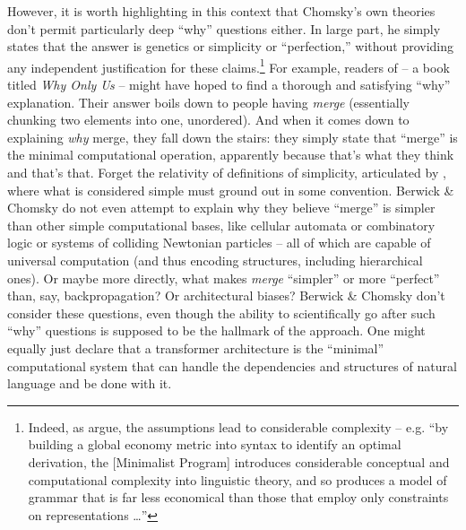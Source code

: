 \documentclass[output=paper,colorlinks,citecolor=brown
]{langscibook}
\begin{document}
However, it is worth highlighting in this context that Chomsky's own theories don't permit particularly deep ``why'' questions either. In large part, he simply states that the answer is genetics or simplicity or ``perfection,'' without providing any independent justification for these claims.\footnote{Indeed, as \citet{johnson1997critique} argue, the assumptions lead to considerable complexity -- e.g. ``by building a global economy  metric into syntax to identify an optimal derivation, the [Minimalist Program] introduces considerable conceptual and computational complexity into linguistic theory, and so produces a model of grammar that is far less economical than those that employ only constraints on representations \ldots ''} For example, readers of  -- a book titled \textit{Why Only Us} -- might have hoped to find a thorough and satisfying ``why'' explanation. Their answer boils down to people having \textit{merge} (essentially chunking two elements into one, unordered). And when it comes down to explaining \textit{why} merge, they fall down the stairs: they simply state that ``merge'' is the minimal computational operation, apparently because that's what they think and that's that. Forget the relativity of definitions of simplicity, articulated by \citet{goodman1965new}, where what is considered simple must ground out in some convention. Berwick \& Chomsky do not even attempt to explain why they believe ``merge'' is simpler than other simple computational bases, like cellular automata or combinatory logic or systems of colliding Newtonian particles -- all of which are capable of universal computation (and thus encoding structures, including hierarchical ones). Or maybe more directly, what makes \textit{merge} ``simpler'' or more ``perfect'' than, say, backpropagation? Or  architectural biases? Berwick \& Chomsky don't consider these questions, even though the ability to scientifically go after such ``why'' questions is supposed to be the hallmark of the approach. One might equally just declare that a transformer architecture is the ``minimal'' computational system that can handle the dependencies and structures of natural language and be done with it.
\end{document}
